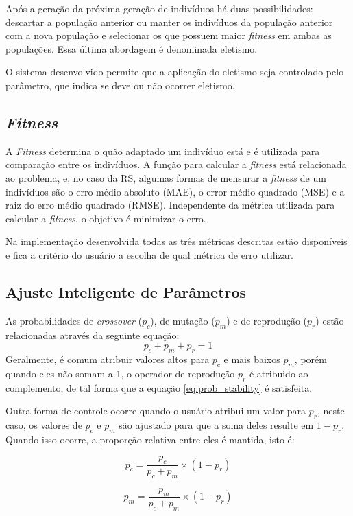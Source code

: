 \documentclass[a4paper]{article}
\begin{document}
Após a geração da próxima geração de indivíduos há duas possibilidades:
descartar a população anterior ou manter os indivíduos da população anterior
com a nova população e selecionar os que possuem maior \textit{fitness} em ambas
as populações. Essa última abordagem é denominada eletismo.

O sistema desenvolvido permite que a aplicação do eletismo seja controlado pelo
parâmetro, que indica se deve ou não ocorrer eletismo.

\subsection{\textit{Fitness}}

A \textit{Fitness} determina o quão adaptado um indivíduo está e é utilizada
para comparação entre os indivíduos. A função para calcular a \textit{fitness}
está relacionada ao problema, e, no caso da RS, algumas formas de mensurar a
\textit{fitness} de um indivíduos são o erro médio absoluto (MAE), o error médio
quadrado (MSE) e a raiz do erro médio quadrado (RMSE). Independente da métrica
utilizada para calcular a \textit{fitness}, o objetivo é minimizar o erro.

Na implementação desenvolvida todas as três métricas descritas estão disponíveis
e fica a critério do usuário a escolha de qual métrica de erro utilizar.

\subsection{Ajuste Inteligente de Parâmetros}\label{subsec:smart_par}

As probabilidades de \textit{crossover} ($p_c$), de mutação ($p_m$) e de
reprodução ($p_r$) estão relacionadas através da seguinte equação:
\begin{equation} \label{eq:prob_stability}
  p_c + p_m + p_r = 1
\end{equation}
Geralmente, é comum atribuir valores altos para $p_c$ e mais baixos $p_m$, porém
quando eles não somam a 1, o operador de reprodução $p_r$ é atribuido ao
complemento, de tal forma que a equação \ref{eq:prob_stability} é satisfeita.

Outra forma de controle ocorre quando o usuário atribui um valor para $p_r$,
neste caso, os valores de $p_c$ e $p_m$ são ajustado para que a soma deles
resulte em $1-p_r$. Quando isso ocorre, a proporção relativa entre eles é
mantida, isto é:

\noindent\begin{minipage}{.5\linewidth}
  \begin{equation*}
    p_c = \frac{p_c}{p_c+p_m}\times (1-p_r)  
  \end{equation*}
\end{minipage}
\begin{minipage}{.5\linewidth}
  \begin{equation*}
    p_m = \frac{p_m}{p_c+p_m}\times (1-p_r)  
  \end{equation*}
\end{minipage}
\end{document}
